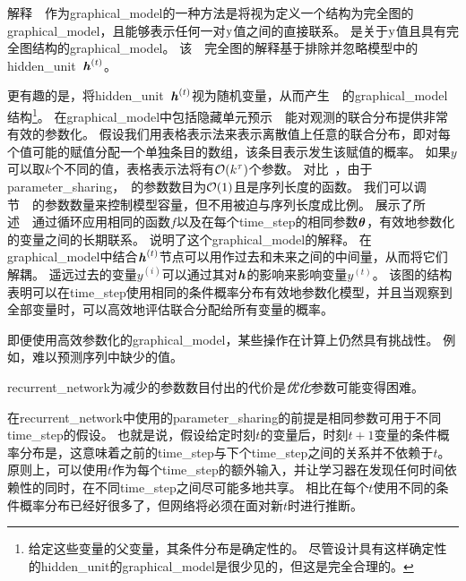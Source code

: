 解释~~作为\gls{graphical_model}的一种方法是将视为定义一个结构为完全图的\gls{graphical_model}，且能够表示任何一对$\mathrm{y}$值之间的直接联系。
是关于$\mathrm{y}$值且具有完全图结构的\gls{graphical_model}。
该~~完全图的解释基于排除并忽略模型中的\gls{hidden_unit}~$\boldsymbol{\mathit{h}}^{(t)}$。


更有趣的是，将\gls{hidden_unit}~$\boldsymbol{\mathit{h}}^{(t)}$视为随机变量，从而产生~~的\gls{graphical_model}结构\footnote{给定这些变量的父变量，其条件分布是确定性的。
尽管设计具有这样确定性的\gls{hidden_unit}的\gls{graphical_model}是很少见的，但这是完全合理的。}。
在\gls{graphical_model}中包括隐藏单元预示~~能对观测的联合分布提供非常有效的参数化。
假设我们用表格表示法来表示离散值上任意的联合分布，即对每个值可能的赋值分配一个单独条目的数组，该条目表示发生该赋值的概率。
如果$y$可以取$k$个不同的值，表格表示法将有$\mathcal{O}(k^\tau)$个参数。
对比~，由于\gls{parameter_sharing}，~的参数数目为$\mathcal{O}(1)$且是序列长度的函数。 %
我们可以调节~~的参数数量来控制模型容量，但不用被迫与序列长度成比例。
展示了所述~~通过循环应用相同的函数$f$以及在每个\gls{time_step}的相同参数$\boldsymbol{\theta}$，有效地参数化的变量之间的长期联系。
说明了这个\gls{graphical_model}的解释。
在\gls{graphical_model}中结合$\boldsymbol{\mathit{h}}^{(t)}$节点可以用作过去和未来之间的中间量，从而将它们解耦。
遥远过去的变量$y^{(i)}$可以通过其对$\boldsymbol{\mathit{h}}$的影响来影响变量$y^{(t)}$。
该图的结构表明可以在\gls{time_step}使用相同的条件概率分布有效地参数化模型，并且当观察到全部变量时，可以高效地评估联合分配给所有变量的概率。


即便使用高效参数化的\gls{graphical_model}，某些操作在计算上仍然具有挑战性。
例如，难以预测序列中缺少的值。

\gls{recurrent_network}为减少的参数数目付出的代价是\emph{优化}参数可能变得困难。

在\gls{recurrent_network}中使用的\gls{parameter_sharing}的前提是相同参数可用于不同\gls{time_step}的假设。
也就是说，假设给定时刻$t$的变量后，时刻$t +1$变量的条件概率分布是，这意味着之前的\gls{time_step}与下个\gls{time_step}之间的关系并不依赖于$t$。
原则上，可以使用$t$作为每个\gls{time_step}的额外输入，并让学习器在发现任何时间依赖性的同时，在不同\gls{time_step}之间尽可能多地共享。
相比在每个$t$使用不同的条件概率分布已经好很多了，但网络将必须在面对新$t$时进行推断。

